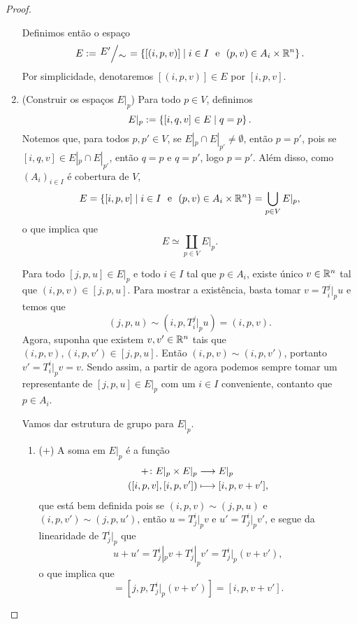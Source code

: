 \begin{proof}
\begin{enumerate}
Definimos então o espaço
	\begin{equation*}
	E:= \quo{E'}{\sim} = \set{[(i,p,v)]}{i \in I \text{\ \ e\ \ } (p,v) \in A_i \times \R^n}.
	\end{equation*}
Por simplicidade, denotaremos $[(i,p,v)] \in E$ por $[i,p,v]$.

\item (Construir os espaços $E|_p$) Para todo $p \in V$, definimos
	\begin{equation*}
	E|_p := \left\{{[i,q,v] \in E}\;\middle\vert\;{q=p}\right\}.
	\end{equation*}
Notemos que, para todos $p,p' \in V$, se $E|_p \cap E|_{p'} \neq \emptyset$, então $p=p'$, pois se $[i,q,v] \in E|_p \cap E|_{p'}$, então $q=p$ e $q=p'$, logo $p=p'$. Além disso, como $(A_i)_{i \in I}$ é cobertura de $V$,
	\begin{equation*}
	E = \left\{{[i,p,v]}\;\middle\vert\;{i \in I \text{\ \ e\ \ } (p,v) \in A_i \times \mathbb{R}^n}\right\} = \bigcup_{p \in V} E|_p,
	\end{equation*}
o que implica que
	\begin{equation*}
	E \simeq \coprod_{p \in V} E|_p.
	\end{equation*}

Para todo $[j,p,u] \in E|_p$ e todo $i \in I$ tal que $p \in A_i$, existe único $v \in \mathbb{R}^n$ tal que $(i,p,v) \in [j,p,u]$. Para mostrar a existência, basta tomar $v = T^j_i|_p u$ e temos que
	\begin{equation*}
	(j,p,u) \sim (i,p,T^j_i|_p u) = (i,p,v).
	\end{equation*}
Agora, suponha que existem $v,v' \in \mathbb{R}^n$ tais que $(i,p,v), (i,p,v') \in [j,p,u]$. Então $(i,p,v) \sim (i,p,v')$, portanto $v' = T^i_i|_p v = v$.	
Sendo assim, a partir de agora podemos sempre tomar um representante de $[j,p,u] \in E|_p$ com um $i \in I$ conveniente, contanto que $p \in A_i$.

Vamos dar estrutura de grupo para $E|_p$.
	\begin{enumerate}
	\item ($+$) A soma em $E|_p$ é a função
	\begin{align*}
	{+}\colon {E|_p \times E|_p} &\longrightarrow {E|_p} \\{([i,p,v] , [i,p,v'])} &\longmapsto [i,p,v + v'],
	\end{align*}
que está bem definida pois se $(i,p,v) \sim (j,p,u)$ e $(i,p,v') \sim (j,p,u')$, então $u = T^i_j|_p v$ e $u' = T^i_j|_p v'$, e segue da linearidade de $T^i_j|_p$ que
	\begin{equation*}
	u + u' = T^i_j|_p v + T^i_j|_p v' = T^i_j|_p (v + v'),
	\end{equation*}
o que implica que
	\begin{equation*}
	[j,p,u + u'] = [j,p,T^i_j|_p (v + v')] = [i,p,v + v'].
	\end{equation*}


\end{enumerate}
\end{enumerate}
\end{proof}
